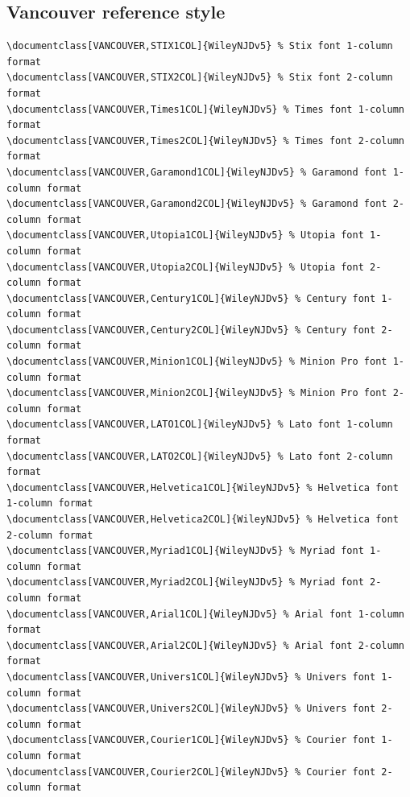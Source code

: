\documentclass[11pt]{article}
\begin{document}
\subsection*{Vancouver reference style}
{\fontsize{9}{10}\selectfont\begin{verbatim}
\documentclass[VANCOUVER,STIX1COL]{WileyNJDv5} % Stix font 1-column format
\documentclass[VANCOUVER,STIX2COL]{WileyNJDv5} % Stix font 2-column format
\documentclass[VANCOUVER,Times1COL]{WileyNJDv5} % Times font 1-column format
\documentclass[VANCOUVER,Times2COL]{WileyNJDv5} % Times font 2-column format
\documentclass[VANCOUVER,Garamond1COL]{WileyNJDv5} % Garamond font 1-column format
\documentclass[VANCOUVER,Garamond2COL]{WileyNJDv5} % Garamond font 2-column format
\documentclass[VANCOUVER,Utopia1COL]{WileyNJDv5} % Utopia font 1-column format
\documentclass[VANCOUVER,Utopia2COL]{WileyNJDv5} % Utopia font 2-column format
\documentclass[VANCOUVER,Century1COL]{WileyNJDv5} % Century font 1-column format
\documentclass[VANCOUVER,Century2COL]{WileyNJDv5} % Century font 2-column format
\documentclass[VANCOUVER,Minion1COL]{WileyNJDv5} % Minion Pro font 1-column format
\documentclass[VANCOUVER,Minion2COL]{WileyNJDv5} % Minion Pro font 2-column format
\documentclass[VANCOUVER,LATO1COL]{WileyNJDv5} % Lato font 1-column format
\documentclass[VANCOUVER,LATO2COL]{WileyNJDv5} % Lato font 2-column format
\documentclass[VANCOUVER,Helvetica1COL]{WileyNJDv5} % Helvetica font 1-column format
\documentclass[VANCOUVER,Helvetica2COL]{WileyNJDv5} % Helvetica font 2-column format
\documentclass[VANCOUVER,Myriad1COL]{WileyNJDv5} % Myriad font 1-column format
\documentclass[VANCOUVER,Myriad2COL]{WileyNJDv5} % Myriad font 2-column format
\documentclass[VANCOUVER,Arial1COL]{WileyNJDv5} % Arial font 1-column format
\documentclass[VANCOUVER,Arial2COL]{WileyNJDv5} % Arial font 2-column format
\documentclass[VANCOUVER,Univers1COL]{WileyNJDv5} % Univers font 1-column format
\documentclass[VANCOUVER,Univers2COL]{WileyNJDv5} % Univers font 2-column format
\documentclass[VANCOUVER,Courier1COL]{WileyNJDv5} % Courier font 1-column format
\documentclass[VANCOUVER,Courier2COL]{WileyNJDv5} % Courier font 2-column format
\end{verbatim}}
\end{document}

